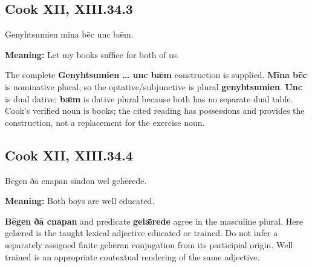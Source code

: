 \par\begin{minipage}{\linewidth}\raggedright
\subsection*{Cook XII, XIII.34.3}

Genyhtsumien mīna bēc unc bǣm.

\textbf{Meaning:} Let my books suffice for both of us.

The complete \textbf{Genyhtsumien … unc bǣm} construction is supplied. \textbf{Mīna bēc} is nominative plural, so the optative/\allowbreak{}subjunctive is plural \textbf{genyhtsumien}. \textbf{Unc} is dual dative; \textbf{bǣm} is dative plural because both has no separate dual table. Cook’s verified noun is books; the cited reading has possessions and provides the construction, not a replacement for the exercise noun.

\end{minipage}\par\addvspace{4pt}

\par\begin{minipage}{\linewidth}\raggedright
\subsection*{Cook XII, XIII.34.4}

Bēgen ðā cnapan sindon wel gelǣrede.

\textbf{Meaning:} Both boys are well educated.

\textbf{Bēgen ðā cnapan} and predicate \textbf{gelǣrede} agree in the masculine plural. Here gelǣred is the taught lexical adjective educated or trained. Do not infer a separately assigned finite gelǣran conjugation from its participial origin. Well trained is an appropriate contextual rendering of the same adjective.

\end{minipage}\par\addvspace{4pt}

